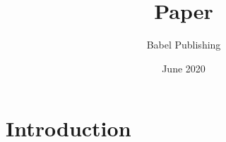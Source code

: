 \documentclass{article}
\title{Paper}
\author{Babel Publishing}
\date{June 2020}
\begin{document}
\maketitle

\section{Introduction}
\end{document}
